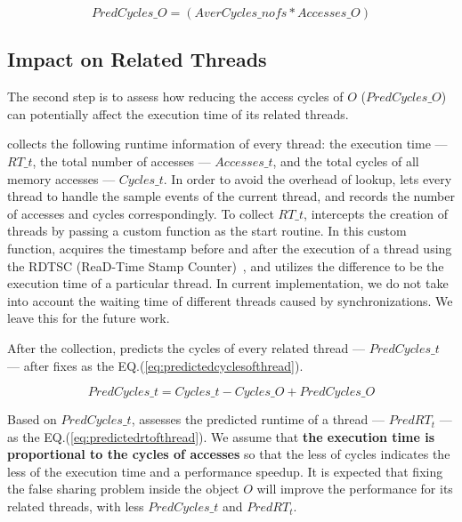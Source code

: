 \begin{equation}
\label{eq:predictedcyclesofo}
PredCycles\_{O} = (AverCycles\_{nofs} * Accesses\_O)
\end{equation} 

\subsection{Impact on Related Threads}
\label{sec:impactthread}

The second step is to assess how reducing the access cycles of $O$ ($PredCycles\_{O}$) can potentially affect the execution time of its related threads. 

\Cheetah{} collects the following runtime information of every thread: the execution time --- $RT\_{t}$, the total number of accesses --- $Accesses\_{t}$, and the total cycles of all memory accesses --- $Cycles\_{t}$. In order to avoid the overhead of lookup, \cheetah{} lets every thread to handle the sample events of the current thread, and records the number of accesses and cycles correspondingly. To collect $RT\_{t}$, \cheetah{} intercepts the creation of threads by passing a custom function as the start routine. In this custom function, \cheetah{} acquires the timestamp before and after the execution of a thread using the RDTSC (ReaD-Time Stamp Counter)~\cite{rtdsc}, and utilizes the difference to be the execution time of a particular thread. In current implementation, we do not take into account the waiting time of different threads caused by synchronizations. We leave this for the future work. 

After the collection, \cheetah{} predicts the cycles of every related thread --- $PredCycles\_{t}$ --- after fixes as the EQ.(\ref{eq:predictedcyclesofthread}). 

\begin{equation}
\label{eq:predictedcyclesofthread}
 PredCycles\_{t} = Cycles\_{t} - Cycles\_{O} + PredCycles\_{O} 
\end{equation} 
 
Based on $PredCycles\_{t}$, \cheetah{} assesses the predicted runtime of a thread --- $PredRT_{t}$ --- as the EQ.(\ref{eq:predictedrtofthread}). We assume that {\bf the execution time is proportional to the cycles of accesses} so that the less of cycles indicates the less of the execution time and a performance speedup. It is expected that fixing the false sharing problem inside the object $O$ will improve the performance for its related threads, with less $PredCycles\_{t}$ and $PredRT_{t}$. 

